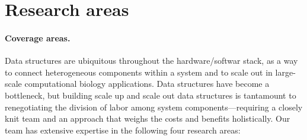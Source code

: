 \section{Research areas}





\paragraph{Coverage areas.} 
Data structures are ubiquitous throughout the hardware/softwar stack, as a way to connect heterogeneous components within a system and to scale out in large-scale computational biology applications. 
Data structures have become a bottleneck, but building scale up and scale out data structures is tantamount to renegotiating the division of labor among system components---requiring a closely knit team and an approach that weighs the costs and benefits holistically.
Our team has extensive expertise in the following four research areas:

